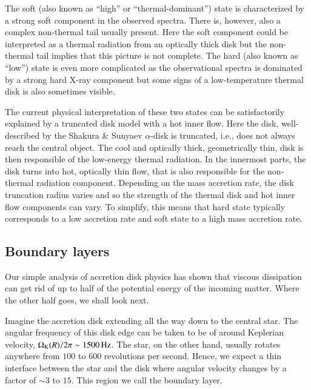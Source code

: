 The soft (also known as ``high'' or ``thermal-dominant'') state is characterized by a strong soft component in the observed spectra.\cite[see e.g.,][]{GZP99}
There is, however, also a complex non-thermal tail usually present.\cite{MRC00}
Here the soft component could be interpreted as a thermal radiation from an optically thick disk but the non-thermal tail implies that this picture is not complete.
The hard (also known as ``low'') state is even more complicated as the observational spectra is dominated by a strong hard X-ray component but some signs of a low-temperature thermal disk is also sometimes visible.\cite{ZG04}

The current physical interpretation of these two states can be satisfactorily explained by a truncated disk model with a hot inner flow.
Here the disk, well-described by the Shakura \& Sunyaev $\alpha$-disk is truncated, i.e., does not always reach the central object.
The cool and optically thick, geometrically thin, disk is then responsible of the low-energy thermal radiation.
In the innermost parts, the disk turns into hot, optically thin flow, that is also responsible for the non-thermal radiation component.
Depending on the mass accretion rate, the disk truncation radius varies and so the strength of the thermal disk and hot inner flow components can vary.
To simplify, this means that hard state typically corresponds to a low accretion rate and soft state to a high mass accretion rate.


\subsection{Boundary layers}

Our simple analysis of accretion disk physics has shown that viscous dissipation can get rid of up to half of the potential energy of the incoming matter.
Where the other half goes, we shall look next.

Imagine the accretion disk extending all the way down to the central star.
The angular frequency of this disk edge can be taken to be of around Keplerian velocity, $\Omega_{\mathrm{K}}(R)/2\pi \sim 1500 \,\mathrm{Hz}$.
The star, on the other hand, usually rotates anywhere from $100$ to $600$ revolutions per second.\cite{Watts12, PTR14}
Hence, we expect a thin interface between the star and the disk where angular velocity changes by a factor of $\sim 3$ to $15$.
This region we call the boundary layer.

